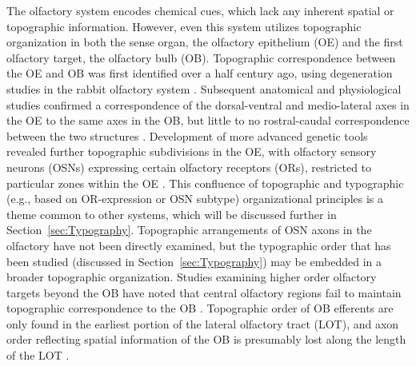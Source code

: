 The olfactory system encodes chemical cues, which lack any inherent spatial or topographic information.
However, even this system utilizes topographic organization in both the sense organ, the olfactory epithelium (OE) and the first olfactory target, the olfactory bulb (OB).
Topographic correspondence between the OE and OB was first identified over a half century ago, using degeneration studies in the rabbit olfactory system \cite{clark1951projection}.
Subsequent anatomical and physiological studies confirmed a correspondence of the dorsal-ventral and medio-lateral axes in the OE to the same axes in the OB, but little to no rostral-caudal correspondence between the two structures \cite{costanzo1978spatially,land1973localized,saucier1986analysis}.
Development of more advanced genetic tools revealed further topographic subdivisions in the OE, with olfactory sensory neurons (OSNs) expressing certain olfactory receptors (ORs), restricted to particular zones within the OE \cite{ressler1993zonal,vassar1993spatial}.
This confluence of topographic and typographic (e.g., based on OR-expression or OSN subtype) organizational principles is a theme common to other systems, which will be discussed further in Section~\ref{sec:Typography}.
Topographic arrangements of OSN axons in the olfactory have not been directly examined, but the typographic order that has been studied (discussed in Section~\ref{sec:Typography}) may be embedded in a broader topographic organization.
Studies examining higher order olfactory targets beyond the OB have noted that central olfactory regions fail to maintain topographic correspondence to the OB \cite{luskin1982distribution,sosulski2011distinct}.
Topographic order of OB efferents are only found in the earliest portion of the lateral olfactory tract (LOT), and axon order reflecting spatial information of the OB is presumably lost along the length of the LOT \cite{price1975observation}.

